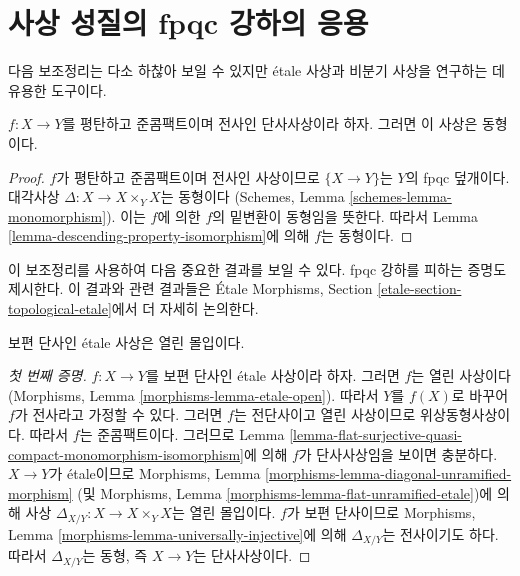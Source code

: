 \section{사상 성질의 fpqc 강하의 응용}
\label{section-application-descending-properties-morphisms}

\noindent
다음 보조정리는 다소 하찮아 보일 수 있지만 \'etale 사상과 비분기 사상을
연구하는 데 유용한 도구이다.

\begin{lemma}
\label{lemma-flat-surjective-quasi-compact-monomorphism-isomorphism}
$f : X \to Y$를 평탄하고 준콤팩트이며 전사인 단사사상이라 하자.
그러면 이 사상은 동형이다.
\end{lemma}

\begin{proof}
$f$가 평탄하고 준콤팩트이며 전사인 사상이므로 $\{X \to Y\}$는 $Y$의
fpqc 덮개이다. 대각사상 $\Delta : X \to X \times_Y X$는 동형이다
(Schemes, Lemma \ref{schemes-lemma-monomorphism}). 이는 $f$에 의한
$f$의 밑변환이 동형임을 뜻한다. 따라서 Lemma
\ref{lemma-descending-property-isomorphism}에 의해 $f$는 동형이다.
\end{proof}

\noindent
이 보조정리를 사용하여 다음 중요한 결과를 보일 수 있다. fpqc 강하를
피하는 증명도 제시한다. 이 결과와 관련 결과들은 \'Etale Morphisms,
Section \ref{etale-section-topological-etale}에서 더 자세히 논의한다.

\begin{lemma}
\label{lemma-universally-injective-etale-open-immersion}
보편 단사인 \'etale 사상은 열린 몰입이다.
\end{lemma}

\begin{proof}[첫 번째 증명]
$f : X \to Y$를 보편 단사인 \'etale 사상이라 하자. 그러면 $f$는 열린
사상이다(Morphisms, Lemma \ref{morphisms-lemma-etale-open}). 따라서
$Y$를 $f(X)$로 바꾸어 $f$가 전사라고 가정할 수 있다. 그러면 $f$는
전단사이고 열린 사상이므로 위상동형사상이다. 따라서 $f$는
준콤팩트이다. 그러므로 Lemma
\ref{lemma-flat-surjective-quasi-compact-monomorphism-isomorphism}에 의해
$f$가 단사사상임을 보이면 충분하다. $X \to Y$가 \'etale이므로
Morphisms, Lemma \ref{morphisms-lemma-diagonal-unramified-morphism}
(및 Morphisms, Lemma \ref{morphisms-lemma-flat-unramified-etale})에 의해
사상 $\Delta_{X/Y} : X \to X \times_Y X$는 열린 몰입이다. $f$가 보편
단사이므로 Morphisms, Lemma
\ref{morphisms-lemma-universally-injective}에 의해 $\Delta_{X/Y}$는
전사이기도 하다. 따라서 $\Delta_{X/Y}$는 동형, 즉 $X \to Y$는
단사사상이다.
\end{proof}

